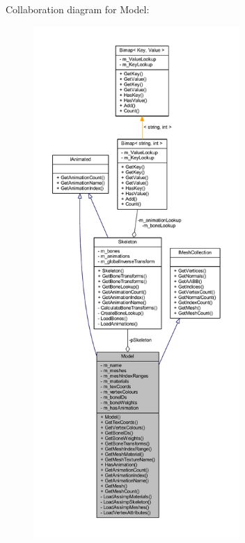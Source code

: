 Collaboration diagram for Model\+:\nopagebreak
\begin{figure}[H]
\begin{center}
\leavevmode
\includegraphics[height=550pt]{class_model__coll__graph}
\end{center}
\end{figure}
